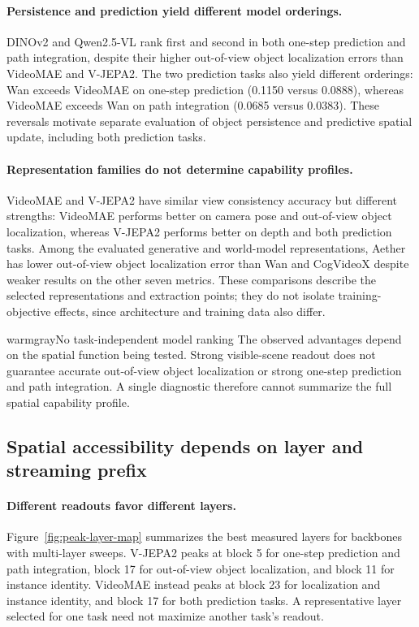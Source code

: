 \documentclass{article} %
\begin{document}
\paragraph{Persistence and prediction yield different model orderings.}
DINOv2 and Qwen2.5-VL rank first and second in both one-step prediction and
path integration, despite their higher out-of-view object localization errors
than VideoMAE and V-JEPA2. The two prediction tasks also yield different
orderings: Wan exceeds VideoMAE on one-step prediction (0.1150 versus
0.0888), whereas VideoMAE exceeds Wan on path integration (0.0685 versus
0.0383). These reversals motivate separate evaluation of object persistence
and predictive spatial update, including both prediction tasks. 

\paragraph{Representation families do not determine capability profiles.}
VideoMAE and V-JEPA2 have similar view consistency accuracy but different
strengths: VideoMAE performs better on camera pose and out-of-view object
localization, whereas V-JEPA2 performs better on depth and both prediction
tasks. Among the evaluated generative and world-model representations,
Aether has lower out-of-view object localization error than Wan and CogVideoX
despite weaker results on the other seven metrics. These comparisons describe
the selected representations and extraction points; they do not isolate
training-objective effects, since architecture and training data also differ.

\begin{keyfinding}{warmgray}{No task-independent model ranking}
The observed advantages depend on the spatial function being tested.
Strong visible-scene readout does not guarantee accurate out-of-view object
localization or strong one-step prediction and path integration.
A single diagnostic therefore cannot summarize the full spatial
capability profile.
\end{keyfinding}


\subsection{Spatial accessibility depends on layer and streaming prefix}
\label{sec:layer-prefix-analysis}

\paragraph{Different readouts favor different layers.}
Figure~\ref{fig:peak-layer-map} summarizes the best measured layers for
backbones with multi-layer sweeps. V-JEPA2 peaks at block 5 for one-step
prediction and path integration, block 17 for out-of-view object localization,
and block 11 for instance identity. VideoMAE instead peaks at
block 23 for localization and instance identity, and block 17 for
both prediction tasks. A representative layer selected for one task need
not maximize another task's readout.
\end{document}
